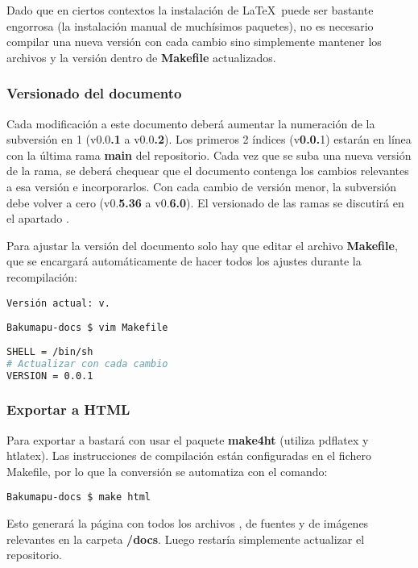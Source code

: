 Dado que en ciertos contextos la instalación de \LaTeX\ puede ser bastante engorrosa (la instalación manual de muchísimos paquetes), no es necesario compilar una nueva versión con cada cambio sino simplemente mantener los archivos  y la versión dentro de \textbf{Makefile} actualizados.

\subsubsection{Versionado del documento}\label{flujo:versionado-del-documento}
Cada modificación a este documento deberá aumentar la numeración de la subversión en 1 (v0.0\textbf{.1} a v0.0\textbf{.2}). Los primeros 2 índices (v\textbf{0.0.}1) estarán en línea con la última rama \textbf{main} del repositorio. Cada vez que se suba una nueva versión de la rama, se deberá chequear que el documento contenga los cambios relevantes a esa versión e incorporarlos. Con cada cambio de versión menor, la subversión debe volver a cero (v0.\textbf{5.36} a v0.\textbf{6.0}). El versionado de las ramas se discutirá en el apartado .

Para ajustar la versión del documento solo hay que editar el archivo \textbf{Makefile}, que se encargará automáticamente de hacer todos los ajustes durante la recompilación:
\begin{center}
\texttt{Versión actual: v\docversion.}
\end{center}

\begin{lstlisting}
Bakumapu-docs $ vim Makefile
\end{lstlisting}
\begin{lstlisting}[language=bash]
SHELL = /bin/sh
# Actualizar con cada cambio
VERSION = 0.0.1
\end{lstlisting}

\subsubsection{Exportar a HTML}\label{flujo:exportar-a-html}
Para exportar a  bastará con usar el paquete \textbf{make4ht} (utiliza pdflatex y htlatex). Las instrucciones de compilación están configuradas en el fichero Makefile, por lo que la conversión se automatiza con el comando:
\begin{lstlisting}
Bakumapu-docs $ make html
\end{lstlisting}
Esto generará la página  con todos los archivos , de fuentes y de imágenes relevantes en la carpeta \textbf{/docs}. Luego restaría simplemente actualizar el repositorio.

